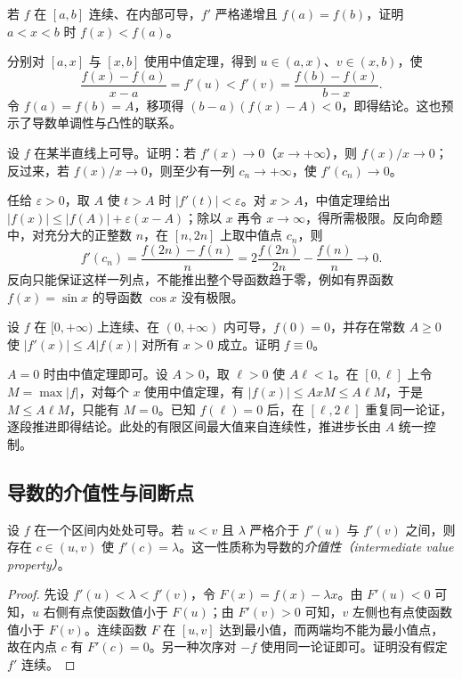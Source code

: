 \begin{example}
\label{ex:pei-diff-increasing-derivative-chord}
若 $f$ 在 $[a,b]$ 连续、在内部可导，$f'$ 严格递增且 $f(a)=f(b)$，证明 $a<x<b$ 时 $f(x)<f(a)$。
\end{example}
\begin{solve}
分别对 $[a,x]$ 与 $[x,b]$ 使用中值定理，得到 $u\in(a,x)$、$v\in(x,b)$，使
\[
 \frac{f(x)-f(a)}{x-a}=f'(u)<f'(v)
 =\frac{f(b)-f(x)}{b-x}.
\]
令 $f(a)=f(b)=A$，移项得 $(b-a)(f(x)-A)<0$，即得结论。这也预示了导数单调性与凸性的联系。
\end{solve}

\begin{example}
\label{ex:pei-diff-sublinear}
设 $f$ 在某半直线上可导。证明：若 $f'(x)\to0$（$x\to+\infty$），则 $f(x)/x\to0$；反过来，若 $f(x)/x\to0$，则至少有一列 $c_n\to+\infty$，使 $f'(c_n)\to0$。
\end{example}
\begin{solve}
任给 $\varepsilon>0$，取 $A$ 使 $t>A$ 时 $|f'(t)|<\varepsilon$。对 $x>A$，中值定理给出
$|f(x)|\le|f(A)|+\varepsilon(x-A)$；除以 $x$ 再令 $x\to\infty$，得所需极限。反向命题中，对充分大的正整数 $n$，在 $[n,2n]$ 上取中值点 $c_n$，则
\[
 f'(c_n)=\frac{f(2n)-f(n)}n
 =2\frac{f(2n)}{2n}-\frac{f(n)}n\longrightarrow0.
\]
反向只能保证这样一列点，不能推出整个导函数趋于零，例如有界函数 $f(x)=\sin x$ 的导函数 $\cos x$ 没有极限。
\end{solve}

\begin{example}
\label{ex:pei-diff-differential-uniqueness}
设 $f$ 在 $[0,+\infty)$ 上连续、在 $(0,+\infty)$ 内可导，$f(0)=0$，并存在常数 $A\ge0$ 使 $|f'(x)|\le A|f(x)|$ 对所有 $x>0$ 成立。证明 $f\equiv0$。
\end{example}
\begin{solve}
$A=0$ 时由中值定理即可。设 $A>0$，取 $\ell>0$ 使 $A\ell<1$。在 $[0,\ell]$ 上令 $M=\max|f|$，对每个 $x$ 使用中值定理，有 $|f(x)|\le AxM\le A\ell M$，于是 $M\le A\ell M$，只能有 $M=0$。已知 $f(\ell)=0$ 后，在 $[\ell,2\ell]$ 重复同一论证，逐段推进即得结论。此处的有限区间最大值来自连续性，推进步长由 $A$ 统一控制。
\end{solve}

\subsection{导数的介值性与间断点}

\begin{theorem}[Darboux 定理]
\label{thm:pei-diff-darboux}
设 $f$ 在一个区间内处处可导。若 $u<v$ 且 $\lambda$ 严格介于 $f'(u)$ 与 $f'(v)$ 之间，则存在 $c\in(u,v)$ 使 $f'(c)=\lambda$。这一性质称为导数的\emph{介值性（intermediate value property）}。
\end{theorem}
\begin{proof}
先设 $f'(u)<\lambda<f'(v)$，令 $F(x)=f(x)-\lambda x$。由 $F'(u)<0$ 可知，$u$ 右侧有点使函数值小于 $F(u)$；由 $F'(v)>0$ 可知，$v$ 左侧也有点使函数值小于 $F(v)$。连续函数 $F$ 在 $[u,v]$ 达到最小值，而两端均不能为最小值点，故在内点 $c$ 有 $F'(c)=0$。另一种次序对 $-f$ 使用同一论证即可。证明没有假定 $f'$ 连续。
\end{proof}

